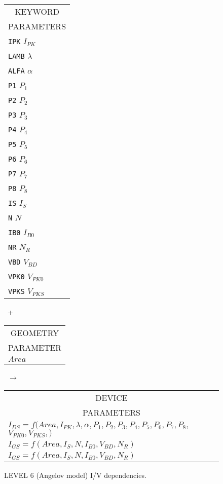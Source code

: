 \begin{figure}[h]
\begin{tabular}[t]{|p{1in}|}
\hline
\multicolumn{1}{|c|}{KEYWORD} \\
\multicolumn{1}{|c|}{PARAMETERS} \\
\hline
\hline
{\tt IPK} \hfill $ I_{PK}$\\
{\tt LAMB} \hfill $ \lambda$\\
{\tt ALFA} \hfill $ \alpha$\\
{\tt P1} \hfill $ P_1$\\
{\tt P2} \hfill $ P_2$\\
{\tt P3} \hfill $ P_3$\\
{\tt P4} \hfill $ P_4$\\
{\tt P5} \hfill $ P_5$\\
{\tt P6} \hfill $ P_6$\\
{\tt P7} \hfill $ P_7$\\
{\tt P8} \hfill $ P_8$\\
{\tt IS} \hfill $ I_S$\\
{\tt N} \hfill $ N$\\
{\tt IB0} \hfill $I_{B0}$\\
{\tt NR} \hfill $ N_R$\\
{\tt VBD} \hfill $ V_{BD}$\\
{\tt VPK0} \hfill $ V_{PK0}$\\
{\tt VPKS} \hfill $ V_{PKS}$\\
\hline
\end{tabular}
\hfill
\parbox{0.2in}{\ \vspace*{0.2in}\newline +}
\hfill
\begin{tabular}[t]{|p{1in}|}
\hline
\multicolumn{1}{|c|}{GEOMETRY} \\
\multicolumn{1}{|c|}{PARAMETER} \\
\hline
$Area$\\
\hline
\end{tabular}
\hfill
\parbox{0.2in}{\ \vspace*{0.2in}\newline $\rightarrow$}
\hfill
\begin{tabular}[t]{|p{1.8in}|}
\hline
\multicolumn{1}{|c|}{DEVICE} \\
\multicolumn{1}{|c|}{PARAMETERS} \\
\hline
$I_{DS} = f(Area, I_{PK}, \lambda, \alpha,$\newline\hspace*{\fill}$
 P_1, P_2, P_3, P_4, P_5, P_6, P_7, P_8,$\newline\hspace*{\fill}$
 V_{PK0}, V_{PKS},)$\\
$I_{GS} =$\newline\hspace*{\fill}$ f(Area, I_S, N, I_{B0}, V_{BD}, N_R)$\\
$I_{GS} =$\newline\hspace*{\fill}$ f(Area, I_S, N, I_{B0}, V_{BD}, N_R)$\\
\hline
\end{tabular}
\caption{LEVEL 6 (Angelov model) I/V dependencies. \label{bleve61i/v}}
\end{figure}

